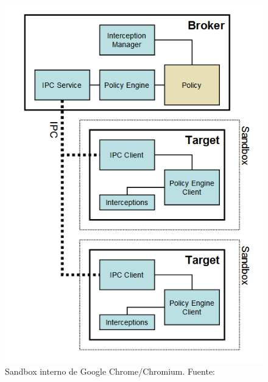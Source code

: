         \begin{figure}[h!t]
            \centering
            \includegraphics[scale=0.5]{figures/sbox_top_diagram.png}
            \caption{Sandbox interno de Google Chrome/Chromium. Fuente: \cite{sandboxGC}}
            \label{fig:SandboxGC}
        \end{figure}

